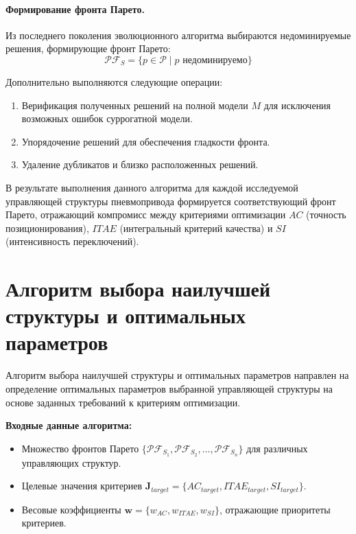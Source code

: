 \paragraph*{Формирование фронта Парето.}

Из последнего поколения эволюционного алгоритма выбираются
недоминируемые решения, формирующие фронт Парето:
\begin{equation}
    \mathcal{PF}_{S} = \{p \in \mathcal{P} \mid p \text{ недоминируемо}\}
\end{equation}

Дополнительно выполняются следующие операции:
\begin{enumerate}
    \item Верификация полученных решений на полной модели $M$ для исключения возможных ошибок суррогатной модели.
    \item Упорядочение решений для обеспечения гладкости фронта.
    \item Удаление дубликатов и близко расположенных решений.
\end{enumerate}

В результате выполнения данного алгоритма для каждой исследуемой управляющей
структуры пневмопривода формируется соответствующий фронт Парето, отражающий
компромисс между критериями оптимизации $AC$ (точность позиционирования), $ITAE$
(интегральный критерий качества) и $SI$ (интенсивность переключений).

\section*{Алгоритм выбора наилучшей структуры и оптимальных параметров}

Алгоритм выбора наилучшей структуры и оптимальных параметров направлен на определение
оптимальных параметров выбранной управляющей структуры на основе
заданных требований к критериям оптимизации.

\textbf{Входные данные алгоритма:}
\begin{itemize}
    \item Множество фронтов Парето $\{\mathcal{PF}_{S_1}, \mathcal{PF}_{S_2}, \ldots, \mathcal{PF}_{S_n}\}$ для различных управляющих структур.
    \item Целевые значения критериев $\mathbf{J}_{target} = \{AC_{target}, ITAE_{target}, SI_{target}\}$.
    \item Весовые коэффициенты $\mathbf{w} = \{w_{AC}, w_{ITAE}, w_{SI}\}$, отражающие приоритеты критериев.
\end{itemize}

